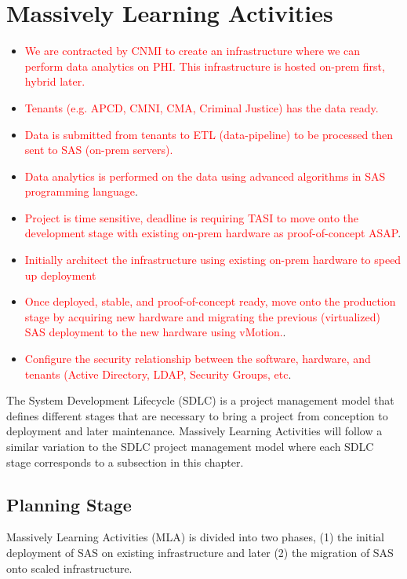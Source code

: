 \section{Massively Learning Activities} \label{section: MLA}
\begin{itemize}
    \item \textcolor{red}{We are contracted by CNMI to create an infrastructure where we can perform data analytics on PHI. This infrastructure is hosted on-prem first, hybrid later.}
    \item \textcolor{red}{Tenants (e.g. APCD, CMNI, CMA, Criminal Justice) has the data ready.}
    \item \textcolor{red}{Data is submitted from tenants to ETL (data-pipeline) to be processed then sent to SAS (on-prem servers).}
    \item \textcolor{red}{Data analytics is performed on the data using advanced algorithms in SAS programming language}. 
    \item \textcolor{red}{Project is time sensitive, deadline is requiring TASI to move onto the development stage with existing on-prem hardware as proof-of-concept ASAP}.
    \item \textcolor{red}{Initially architect the infrastructure using existing on-prem hardware to speed up deployment}
    \item \textcolor{red}{Once deployed, stable, and proof-of-concept ready, move onto the production stage by acquiring new hardware and migrating the previous (virtualized) SAS deployment to the new hardware using vMotion.}.
    \item \textcolor{red}{Configure the security relationship between the software, hardware, and tenants (Active Directory, LDAP, Security Groups, etc}.
\end{itemize}

The System Development Lifecycle (SDLC) is a project management model that defines different stages that are necessary to bring a project from conception to deployment and later maintenance. Massively Learning Activities will follow a similar variation to the SDLC project management model where each SDLC stage corresponds to a subsection in this chapter. 

\subsection{Planning Stage}
Massively Learning Activities (MLA) is divided into two phases, (1) the initial deployment of SAS on existing infrastructure and later (2) the migration of SAS onto scaled infrastructure. 

